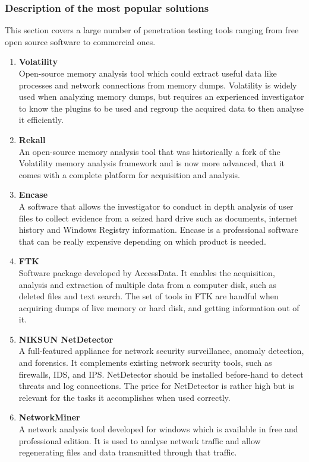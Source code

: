 \subsubsection{Description of the most popular solutions}
This section covers a large number of penetration testing tools ranging from free open source software to commercial ones.
\begin{enumerate}
\item \textbf{Volatility} \\ Open-source memory analysis tool which could extract useful data like processes and network connections from memory dumps. Volatility is widely used when analyzing memory dumps, but requires an experienced investigator to know the plugins to be used and regroup the acquired data to then analyse it efficiently.
\item \textbf{Rekall} \\ An open-source memory analysis tool that was historically a fork of the Volatility memory analysis framework and is now more advanced, that it comes with a complete platform for acquisition and analysis.
\item \textbf{Encase} \\ A software that allows the investigator to conduct in depth analysis of user files to collect evidence from a seized hard drive such as documents, internet history and Windows Registry information. Encase is a professional software that can be really expensive depending on which product is needed.
\item \textbf{FTK} \\ Software package developed by AccessData. It enables the acquisition, analysis and extraction of multiple data from a computer disk, such as deleted files and text search. The set of tools in FTK are handful when acquiring dumps of live memory or hard disk, and getting information out of it.
\item \textbf{NIKSUN NetDetector} \\ 
A full-featured appliance for network security surveillance, anomaly detection, and forensics. It complements existing network security tools, such as firewalls, IDS, and IPS. NetDetector should be installed before-hand to detect threats and log connections. The price for NetDetector is rather high but is relevant for the tasks it accomplishes when used correctly.
\item \textbf{NetworkMiner} \\ 
A network analysis tool developed for windows which is available in free and professional edition. It is used to analyse network traffic and allow regenerating files and data transmitted through that traffic.
\end{enumerate}
